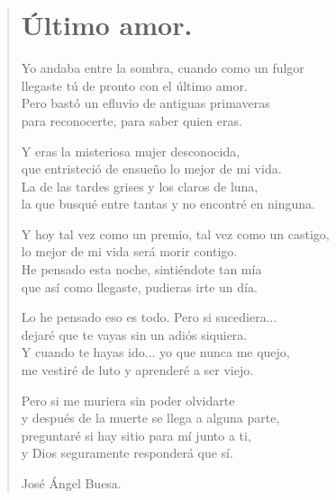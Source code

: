 \documentclass[11pt, portrait, twoside, notitlepage, openright]{book}
\begin{document}
\newpage
\begin{verse}
\begin{center}
\section{Último amor.}
\end{center}
Yo andaba entre la sombra, cuando como un fulgor\\
llegaste tú de pronto con el último amor.\\
Pero bastó un efluvio de antiguas primaveras\\
para reconocerte, para saber quien eras.
\newline

Y eras la misteriosa mujer desconocida,\\
que entristeció de ensueño lo mejor de mi vida.\\
La de las tardes grises y los claros de luna,\\
la que busqué entre tantas y no encontré en ninguna.
\newline

Y hoy tal vez como un premio, tal vez como un castigo,\\
lo mejor de mi vida será morir contigo.\\
He pensado esta noche, sintiéndote tan mía\\
que así como llegaste, pudieras irte un día.
\newline

Lo he pensado eso es todo. Pero si sucediera...\\
dejaré que te vayas sin un adiós siquiera.\\
Y cuando te hayas ido... yo que nunca me quejo,\\
me vestiré de luto y aprenderé a ser viejo.
\newpage

Pero si me muriera sin poder olvidarte\\
y después de la muerte se llega a alguna parte,\\
preguntaré si hay sitio para mí junto a ti,\\
y Dios seguramente responderá que sí.
\newline

José Ángel Buesa.
\end{verse}
\end{document}
